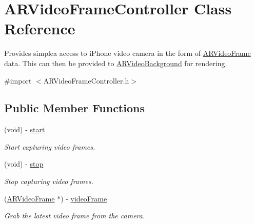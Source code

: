 \hypertarget{interface_a_r_video_frame_controller}{
\section{ARVideoFrameController Class Reference}
\label{interface_a_r_video_frame_controller}
}


Provides simplea access to iPhone video camera in the form of \hyperlink{struct_a_r_video_frame}{ARVideoFrame} data. This can then be provided to \hyperlink{interface_a_r_video_background}{ARVideoBackground} for rendering.  




{\ttfamily \#import $<$ARVideoFrameController.h$>$}

\subsection*{Public Member Functions}
\begin{DoxyCompactItemize}
\item 
\hypertarget{interface_a_r_video_frame_controller_a6ee104be0e287fea2f8beed4f4e97cf6}{
(void) -\/ \hyperlink{interface_a_r_video_frame_controller_a6ee104be0e287fea2f8beed4f4e97cf6}{start}}
\label{interface_a_r_video_frame_controller_a6ee104be0e287fea2f8beed4f4e97cf6}

\begin{DoxyCompactList}\small\item\em Start capturing video frames. \end{DoxyCompactList}\item 
\hypertarget{interface_a_r_video_frame_controller_a509702d9d3e1fa9932bb304ea3f509fb}{
(void) -\/ \hyperlink{interface_a_r_video_frame_controller_a509702d9d3e1fa9932bb304ea3f509fb}{stop}}
\label{interface_a_r_video_frame_controller_a509702d9d3e1fa9932bb304ea3f509fb}

\begin{DoxyCompactList}\small\item\em Stop capturing video frames. \end{DoxyCompactList}\item 
(\hyperlink{struct_a_r_video_frame}{ARVideoFrame} $\ast$) -\/ \hyperlink{interface_a_r_video_frame_controller_acc064912b45b3e81fcbc8b21d2953e29}{videoFrame}
\begin{DoxyCompactList}\small\item\em Grab the latest video frame from the camera. \end{DoxyCompactList}\end{DoxyCompactItemize}


